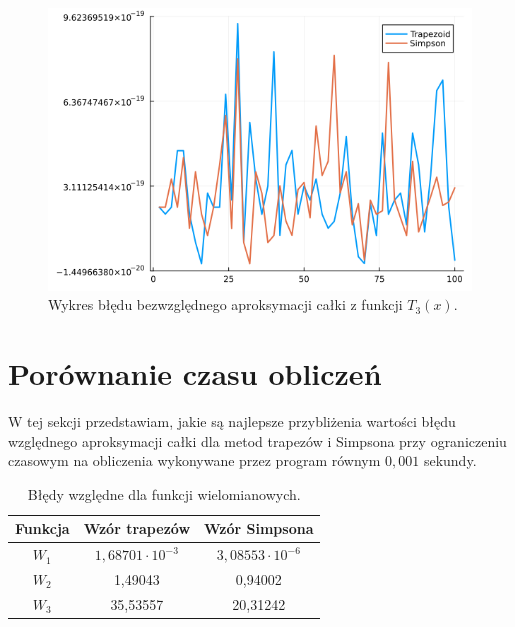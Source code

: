 \documentclass{article}
\theoremstyle{definition}
\begin{document}
\begin{figure}[h!]
    \centering
    \includegraphics[scale=0.5]{plot_T3_abs.png}
    \caption{Wykres błędu bezwzględnego aproksymacji całki z funkcji \(T_3(x)\).}
    \label{fig:plot_T3_abs}
\end{figure}

\clearpage


\section{Porównanie czasu obliczeń}
\label{roz:czas}

W tej sekcji przedstawiam, jakie są najlepsze przybliżenia wartości błędu względnego aproksymacji całki dla metod trapezów i Simpsona przy ograniczeniu czasowym na obliczenia wykonywane przez program równym \( 0,001\) sekundy.

\begin{table}[!h]
    \centering
    \begin{tabular}{|c|c|c|}
            \hline
             Funkcja & Wzór trapezów &  Wzór Simpsona \\
             \hline \hline
            \(W_1\) & \(1,68701 \cdot 10^{-3} \) & \(3,08553 \cdot 10^{-6} \)\\
            \(W_2\) & 1,49043 & 0,94002 \\
            \(W_3\) & 35,53557 & 20,31242 \\
            \hline
    \end{tabular}
    \caption{Błędy względne dla funkcji wielomianowych.}
    \label{tab:wielomiany}
\end{table}
\end{document}
